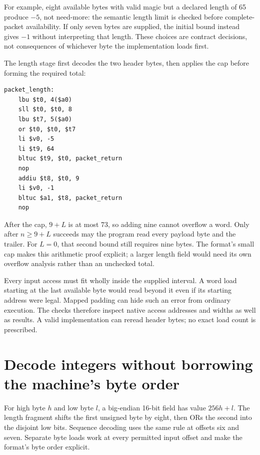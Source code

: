 

For example, eight available bytes with valid magic but a declared length of
65 produce $-5$, not need-more: the semantic length limit is checked before
complete-packet availability. If only seven bytes are supplied, the initial
bound instead gives $-1$ without interpreting that length. These choices are
contract decisions, not consequences of whichever byte the implementation loads
first.

The length stage first decodes the two header bytes, then applies the cap before
forming the required total:

\noindent\begin{minipage}{\linewidth}
  \begin{verbatim}
packet_length:
    lbu $t0, 4($a0)
    sll $t0, $t0, 8
    lbu $t7, 5($a0)
    or $t0, $t0, $t7
    li $v0, -5
    li $t9, 64
    bltuc $t9, $t0, packet_return
    nop
    addiu $t8, $t0, 9
    li $v0, -1
    bltuc $a1, $t8, packet_return
    nop
\end{verbatim}
\end{minipage}

After the cap, $9+L$ is at most 73, so adding nine cannot overflow a word. Only
after $n\geq9+L$ succeeds may the program read every payload byte and the trailer.
For $L=0$, that second bound still requires nine bytes. The format's small cap
makes this arithmetic proof explicit; a larger length field would need its own
overflow analysis rather than an unchecked total.

Every input access must fit wholly inside the supplied interval. A word load
starting at the last available byte would read beyond it even if its starting
address were legal. Mapped padding can hide such an error from ordinary execution.
The checks therefore inspect native access addresses and widths as well as results.
A valid implementation can reread header bytes; no exact load count is prescribed.

\section{Decode integers without borrowing the machine's byte order}

For high byte $h$ and low byte $l$, a big-endian 16-bit field has value
$256h+l$. The length fragment shifts the first unsigned byte by eight, then ORs
the second into the disjoint low bits. Sequence decoding uses the same rule at
offsets six and seven. Separate byte loads work at every permitted input offset
and make the format's byte order explicit.

